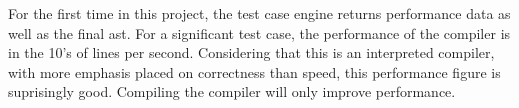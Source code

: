 \documentclass{article}[1994/05/24]
\begin{document}
	For the first time in this project, the test case engine
returns performance data as well as the final ast.  For a significant
test case, the performance of the compiler is in the 10's of lines per
second.  Considering that this is an interpreted compiler, with more
emphasis placed on correctness than speed, this performance figure is
suprisingly good. Compiling the compiler will only improve performance.



\end{document}
